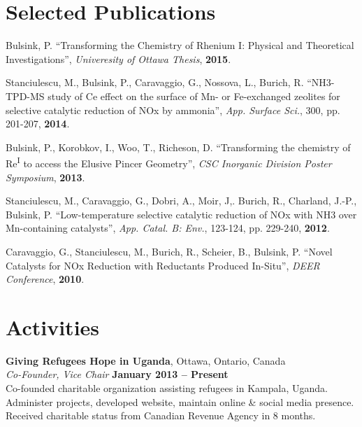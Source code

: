 \documentclass[margin,line]{resume}
\begin{document}
\begin{resume}
    \section{\mysidestyle Selected Publications}
    Bulsink, P. ``Transforming the Chemistry of Rhenium I: Physical and Theoretical Investigations'', \textit{Univeresity of Ottawa Thesis}, \textbf{2015}.

	Stanciulescu, M., Bulsink, P., Caravaggio, G., Nossova, L., Burich, R. ``NH3-TPD-MS study of Ce effect on the surface of Mn- or Fe-exchanged zeolites for selective catalytic reduction of NOx by ammonia'', \textit{App. Surface Sci.}, 300, pp. 201-207, \textbf{2014}.

	\vspace{0mm}
	Bulsink, P., Korobkov, I., Woo, T., Richeson, D. ``Transforming the chemistry of Re\textsuperscript{I} to access the Elusive Pincer Geometry'', \textit{CSC Inorganic Division Poster Symposium}, \textbf{2013}.

	\vspace{0mm}
    Stanciulescu, M., Caravaggio, G., Dobri, A., Moir, J,. Burich, R., Charland, J.-P., Bulsink, P. ``Low-temperature selective catalytic reduction of NOx with NH3 over Mn-containing catalysts'', \textit{App. Catal. B: Env.}, 123-124, pp. 229-240, \textbf{2012}.

	\vspace{0mm}
    Caravaggio, G., Stanciulescu, M., Burich, R., Scheier, B., Bulsink, P. ``Novel Catalysts for NOx Reduction with Reductants Produced In-Situ'', \textit{DEER Conference}, \textbf{2010}.
\vspace{1mm}

    \section{\mysidestyle Activities}

    \textbf{Giving Refugees Hope in Uganda}, Ottawa, Ontario, Canada\\\vspace{1mm}%
    \textsl{Co-Founder, Vice Chair} \hfill \textbf{January 2013 -- Present}\\
    Co-founded charitable organization assisting refugees in Kampala, Uganda.
    Administer projects, developed website, maintain online \& social media presence.
    Received charitable status from Canadian Revenue Agency in 8 months.


\end{resume}
\end{document}
